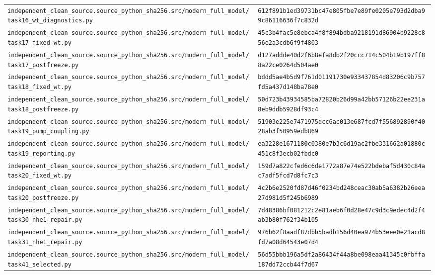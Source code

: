 \begin{longtable}{p{.46\linewidth}p{.46\linewidth}}
\nolinkurl{independent_clean_source.source_python_sha256.src/modern_full_model/task16_wt_diagnostics.py} & \nolinkurl{612f891b1ed39731bc47e805fbe7e89fe0205e793d2dba99c86116636f7c832d} \\
\nolinkurl{independent_clean_source.source_python_sha256.src/modern_full_model/task17_fixed_wt.py} & \nolinkurl{45c3b4fac5e8ebca4f8f894bdba9218191d86904b9228c856e2a3cdb6f9f4803} \\
\nolinkurl{independent_clean_source.source_python_sha256.src/modern_full_model/task17_postfreeze.py} & \nolinkurl{d127addde40d2f6b8efa8db2f20ccc714c504b19b197ff88a22ce0264d504ae0} \\
\nolinkurl{independent_clean_source.source_python_sha256.src/modern_full_model/task18_fixed_wt.py} & \nolinkurl{bddd5ae4b5d9f761d01191730e933437854d83206c9b757fd5a437d148ba78e0} \\
\nolinkurl{independent_clean_source.source_python_sha256.src/modern_full_model/task18_postfreeze.py} & \nolinkurl{50d723b43934585ba72820b26d99a42bb57126b22ee231a8eb9ddb5928df93c4} \\
\nolinkurl{independent_clean_source.source_python_sha256.src/modern_full_model/task19_pump_coupling.py} & \nolinkurl{51903e225e7471975dcc6ac013e687fcd7f556892890f4028ab3f50959edb869} \\
\nolinkurl{independent_clean_source.source_python_sha256.src/modern_full_model/task19_reporting.py} & \nolinkurl{ea3228e1671180c0380e7b3c6d19ac2fbe331662a01880c451c8f3ecb02fbdc0} \\
\nolinkurl{independent_clean_source.source_python_sha256.src/modern_full_model/task20_fixed_wt.py} & \nolinkurl{159d7a822cfed6c6de1772a87e74e522bdebaf5d430c84ac7adf5fcd7d8fc7c3} \\
\nolinkurl{independent_clean_source.source_python_sha256.src/modern_full_model/task20_postfreeze.py} & \nolinkurl{4c2b6e2520fd87d46f0234bd248ceac30ab5a6382b26eea27d981d5f245b6989} \\
\nolinkurl{independent_clean_source.source_python_sha256.src/modern_full_model/task30_nhe1_repair.py} & \nolinkurl{7d48386bf081212c2e81aeb6f0d28e47c9d3c9edec4d2f4ab3b80f762f34b105} \\
\nolinkurl{independent_clean_source.source_python_sha256.src/modern_full_model/task31_nhe1_repair.py} & \nolinkurl{976b62f8aadf87dbb5badb156d40ea974b53eee0e21acd8fd7a08d64543e07d4} \\
\nolinkurl{independent_clean_source.source_python_sha256.src/modern_full_model/task41_selected.py} & \nolinkurl{56d55bbb196a5df2a86434f44a8be098eaa41345c0fbffa187dd72ccb44f7d67} \\

\end{longtable}
